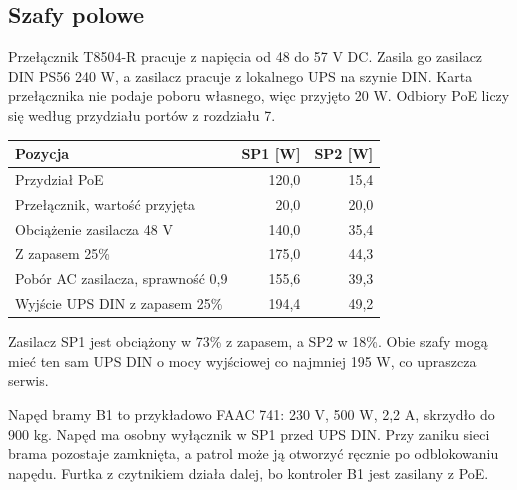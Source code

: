 \subsection*{Szafy polowe}
Przełącznik T8504-R pracuje z napięcia od 48 do 57 V DC. Zasila go zasilacz DIN PS56 240 W, a zasilacz pracuje z lokalnego UPS na szynie DIN.\cite{S-T8504} Karta przełącznika nie podaje poboru własnego, więc przyjęto 20 W. Odbiory PoE liczy się według przydziału portów z rozdziału 7.\cite{OWN}
\begin{center}
\small
\begin{tabular}{@{}lrr@{}}
\toprule
Pozycja & SP1 [W] & SP2 [W] \\
\midrule
Przydział PoE & 120,0 & 15,4 \\
Przełącznik, wartość przyjęta & 20,0 & 20,0 \\
\midrule
Obciążenie zasilacza 48 V & 140,0 & 35,4 \\
Z zapasem 25\% & 175,0 & 44,3 \\
Pobór AC zasilacza, sprawność 0,9 & 155,6 & 39,3 \\
Wyjście UPS DIN z zapasem 25\% & 194,4 & 49,2 \\
\bottomrule
\end{tabular}
\end{center}
Zasilacz SP1 jest obciążony w 73\% z zapasem, a SP2 w 18\%. Obie szafy mogą mieć ten sam UPS DIN o mocy wyjściowej co najmniej 195 W, co upraszcza serwis.

Napęd bramy B1 to przykładowo FAAC 741: 230 V, 500 W, 2,2 A, skrzydło do 900 kg.\cite{S-GATE} Napęd ma osobny wyłącznik w SP1 przed UPS DIN. Przy zaniku sieci brama pozostaje zamknięta, a patrol może ją otworzyć ręcznie po odblokowaniu napędu. Furtka z czytnikiem działa dalej, bo kontroler B1 jest zasilany z PoE.\cite{S-KD}


